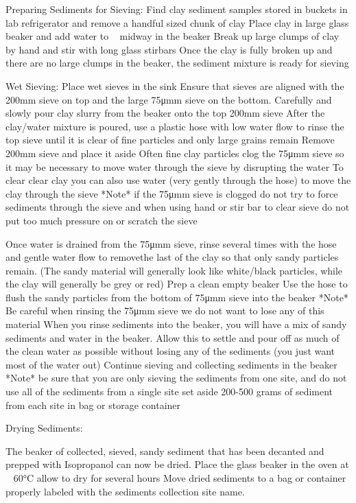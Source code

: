 \documentclass[letterpaper, 12pt, openany]{book}
\begin{document}
Preparing Sediments for Sieving: 
Find clay sediment samples stored in buckets in lab refrigerator and remove a handful sized chunk of clay 
Place clay in large glass beaker and add water to ~ midway in the beaker 
Break up large clumps of clay by hand and stir with long glass stirbars 
Once the clay is fully broken up and there are no large clumps in the beaker, the sediment mixture is ready for sieving 

Wet Sieving: 
Place wet sieves in the sink 
Ensure that sieves are aligned with the 200mm sieve on top and the large 75\unit{\micro\meter}m sieve on the bottom.
Carefully and slowly pour clay slurry from the beaker onto the top 200mm sieve
After the clay/water mixture is poured, use a plastic hose with low water flow to rinse the top sieve until it is clear of fine particles and only large grains remain
Remove 200mm sieve and place it aside 
Often fine clay particles clog the 75\unit{\micro\meter}m sieve so it may be necessary to move water through the sieve by disrupting the water  
To clear clear clay you can also use water (very gently through the hose) to move the clay through the sieve
*Note* if the 75\unit{\micro\meter}m sieve is clogged do not try to force sediments through the sieve and when using hand or stir bar to clear sieve do not put too much pressure on or scratch the sieve 

Once water is drained from the 75\unit{\micro\meter}m sieve, rinse several times with the hose and gentle water flow to removethe last of the clay so that only sandy particles remain. 
(The sandy material will generally look like white/black particles, while the clay will generally be grey or red)
Prep a clean empty beaker 
Use the hose to flush the sandy particles from the bottom of 75\unit{\micro\meter}m sieve into the beaker 
*Note* Be careful when rinsing the 75\unit{\micro\meter}m sieve we do not want to lose any of this material 
When you rinse sediments into the beaker, you will have a mix of sandy sediments and water in the beaker. Allow this to settle and pour off as much of the clean water as possible without losing any of the sediments (you just want most of the water out) 
Continue sieving and collecting sediments in the beaker 
*Note* be sure that you are only sieving the sediments from one site, and do not use all of the sediments from a single site set aside 200-500 grams of sediment from each site in bag or storage container

Drying Sediments: 

The beaker of collected, sieved, sandy sediment that has been decanted and prepped with Isopropanol can now be dried. 
Place the glass beaker in the oven at ~ 60\unit{\degreeCelsius} allow to dry for several hours 
Move dried sediments to a bag or container properly labeled with the sediments collection site name.  
\end{document}
